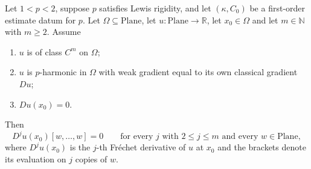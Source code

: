 \begin{lemma}
Let $1<p<2$, suppose $p$ satisfies Lewis rigidity, and let $(\kappa,C_0)$ be a first-order
estimate datum for $p$.  Let $\Omega\subseteq\mathrm{Plane}$, let
$u\colon\mathrm{Plane}\to\mathbb{R}$, let $x_0\in\Omega$ and let $m\in\mathbb{N}$ with
$m\ge2$.  Assume
\begin{enumerate}
\item $u$ is of class $C^{m}$ on $\Omega$;
\item $u$ is $p$-harmonic in $\Omega$ with weak gradient equal to its own classical gradient
$Du$;
\item $Du(x_0)=0$.
\end{enumerate}
Then
\[
  D^{j}u(x_0)[w,\ldots,w]=0\qquad\text{for every }j\text{ with }2\le j\le m
  \text{ and every }w\in\mathrm{Plane},
\]
where $D^{j}u(x_0)$ is the $j$-th Fr\'echet derivative of $u$ at $x_0$ and the brackets denote
its evaluation on $j$ copies of $w$.
\end{lemma}
